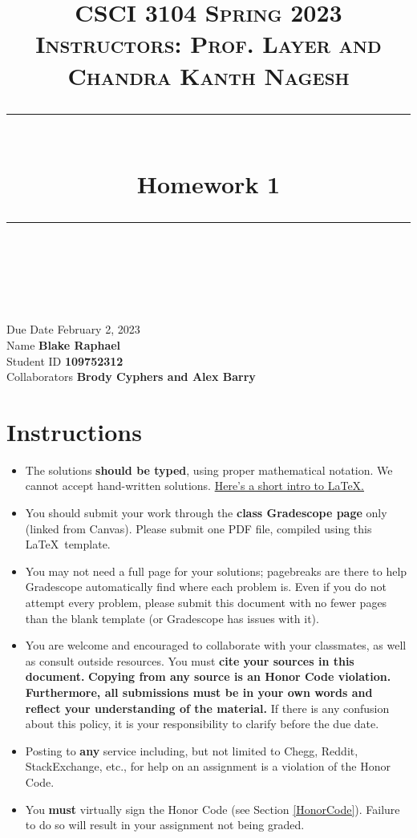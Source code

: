 \documentclass[11pt]{article}
\title{
\normalfont \normalsize 
\textsc{CSCI 3104 Spring 2023 \\ 
Instructors: Prof. Layer and Chandra Kanth Nagesh} \\
[10pt] 
\rule{\linewidth}{0.5pt} \\[6pt] 
\huge Homework 1 \\
\rule{\linewidth}{2pt}  \\[10pt]
}
\date{}
\theoremstyle{definition}
\theoremstyle{definition}
\theoremstyle{definition}
\begin{document}
\maketitle


\noindent
Due Date \dotfill February 2, 2023 \\
Name \dotfill \textbf{Blake Raphael} \\
Student ID \dotfill \textbf{109752312} \\
Collaborators \dotfill \textbf{Brody Cyphers and Alex Barry}

\tableofcontents

\section{Instructions}
 \begin{itemize}
	\item The solutions \textbf{should be typed}, using proper mathematical notation. We cannot accept hand-written solutions. \href{http://ece.uprm.edu/~caceros/latex/introduction.pdf}{Here's a short intro to \LaTeX.}
	\item You should submit your work through the \textbf{class Gradescope page} only (linked from Canvas). Please submit one PDF file, compiled using this \LaTeX \ template.
	\item You may not need a full page for your solutions; pagebreaks are there to help Gradescope automatically find where each problem is. Even if you do not attempt every problem, please submit this document with no fewer pages than the blank template (or Gradescope has issues with it).

	\item You are welcome and encouraged to collaborate with your classmates, as well as consult outside resources. You must \textbf{cite your sources in this document.} \textbf{Copying from any source is an Honor Code violation. Furthermore, all submissions must be in your own words and reflect your understanding of the material.} If there is any confusion about this policy, it is your responsibility to clarify before the due date. 

	\item Posting to \textbf{any} service including, but not limited to Chegg, Reddit, StackExchange, etc., for help on an assignment is a violation of the Honor Code.

	\item You \textbf{must} virtually sign the Honor Code (see Section \ref{HonorCode}). Failure to do so will result in your assignment not being graded.
\end{itemize}
\end{document}
